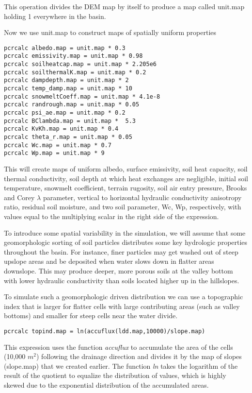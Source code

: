 This operation divides the DEM map by itself to produce a map called \textsf{unit.map} holding 1 everywhere in the basin. 

Now we use \textsf{unit.map} to construct maps of spatially uniform properties

\begin{verbatim}
pcrcalc albedo.map = unit.map * 0.3
pcrcalc emissivity.map = unit.map * 0.98
pcrcalc soilheatcap.map = unit.map * 2.205e6
pcrcalc soilthermalK.map = unit.map * 0.2
pcrcalc dampdepth.map = unit.map * 2
pcrcalc temp_damp.map = unit.map * 10
pcrcalc snowmeltCoeff.map = unit.map * 4.1e-8
pcrcalc randrough.map = unit.map * 0.05
pcrcalc psi_ae.map = unit.map * 0.2
pcrcalc BClambda.map = unit.map *  5.3
pcrcalc KvKh.map = unit.map * 0.4
pcrcalc theta_r.map = unit.map * 0.05
pcrcalc Wc.map = unit.map * 0.7
pcrcalc Wp.map = unit.map * 9
\end{verbatim}

This will create maps of uniform albedo, surface emissivity, soil heat capacity, soil thermal conductivity, soil depth at which heat exchanges are negligible, initial soil temperature, snowmelt coefficient, terrain rugosity, soil air entry pressure, Brooks and Corey $\lambda$ parameter, vertical to horizontal hydraulic conductivity anisotropy ratio, residual soil moisture, and two soil parameter, Wc, Wp, respectively, with values equal to the multiplying scalar in the right side of the expression. 

To introduce some spatial variability in the simulation, we will assume that some geomorphologic sorting of soil particles distributes some key hydrologic properties throughout the basin. For instance, finer particles may get washed out of steep upslope areas and be deposited when water slows down in flatter areas downslope. This may produce deeper, more porous soils at the valley bottom with lower hydraulic conductivity than soils located higher up in the hillslopes. 

To simulate such a geomorphologic driven distribution we can use a topographic index that is larger for flatter cells with large contributing areas (such as valley bottoms) and smaller for steep cells near the water divide. 

\begin{verbatim}
pcrcalc topind.map = ln(accuflux(ldd.map,10000)/slope.map)
\end{verbatim}

This expression uses the function \textit{accuflux} to accumulate the area of the cells (10,000 $m^{2}$) following the drainage direction and divides it by the map of slopes (\textsf{slope.map}) that we created earlier. The function \textit{ln} takes the logarithm of the result of the quotient to equalize the distribution of values, which is highly skewed due to the exponential distribution of the accumulated areas.

